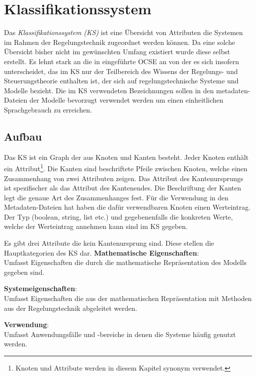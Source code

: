 \chapter{Klassifikationssystem}
Das \textit{Klassifikationssystem (KS)} ist eine Übersicht von Attributen die Systemen im Rahmen der Regelungstechnik zugeordnet werden können. Da eine solche Übersicht bisher nicht im gewünschten Umfang existiert wurde diese selbst erstellt. Es lehnt stark an die in \cite{KNHE20} eingeführte OCSE an von der es sich insofern unterscheidet, das im KS nur der Teilbereich des Wissens der Regelungs- und Steuerungstheorie enthalten ist, der sich auf regelungstechnische Systeme und Modelle bezieht. Die im KS verwendeten Bezeichnungen sollen in den metadaten-Dateien der Modelle bevorzugt verwendet werden um einen einheitlichen Sprachgebrauch zu erreichen. 

\section{Aufbau}
Das KS ist ein Graph der aus Knoten und Kanten besteht. Jeder Knoten enthält ein Attribut\footnote{Knoten und Attribute werden in diesem Kapitel synonym verwendet.}. Die Kanten sind beschriftete Pfeile zwischen Knoten, welche einen Zusammenhang von zwei Attributen zeigen. Das Attribut des Kantenursprungs ist spezifischer als das Attribut des Kantenendes. Die Beschriftung der Kanten legt die genaue Art des Zusammenhanges fest. Für die Verwendung in den Metadaten-Dateien hat haben die dafür verwendbaren Knoten einen Werteintrag. Der Typ (boolean, string, list etc.) und gegebenenfalls die konkreten Werte, welche der Werteintrag annehmen kann sind im KS gegeben.

Es gibt drei Attribute die kein Kantenursprung sind. Diese stellen die Hauptkategorien des KS dar.
\textbf{Mathematische Eigenschaften}: \\
Umfasst Eigenschaften die durch die mathematische Repräsentation des Modells gegeben sind. %

\textbf{Systemeigenschaften}: \\
Umfasst Eigenschaften die aus der mathematischen Repräsentation mit Methoden aus der Regelungstechnik abgeleitet werden.

\textbf{Verwendung}: \\
Umfasst Anwendungsfälle und -bereiche in denen die Systeme häufig genutzt werden.